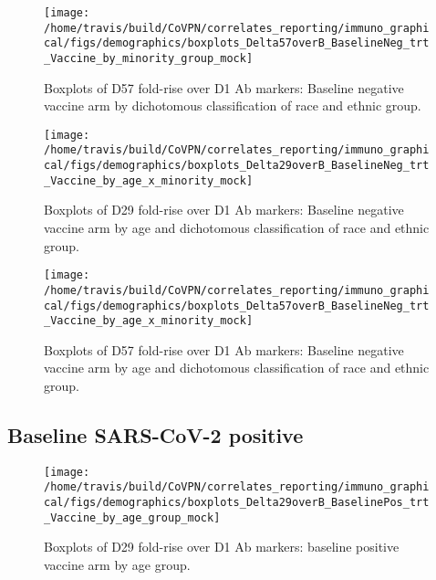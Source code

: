 \documentclass[]{book}
\theoremstyle{definition}
\theoremstyle{definition}
\theoremstyle{definition}
\newcommand{\1}{\mathbbm{1}}
\begin{document}
\begin{figure}[H]

{\centering \texttt{[image: /home/travis/build/CoVPN/correlates\_reporting/immuno\_graphical/figs/demographics/boxplots\_Delta57overB\_BaselineNeg\_trt\_Vaccine\_by\_minority\_group\_mock]} 

}

\caption{Boxplots of D57 fold-rise over D1 Ab markers: Baseline negative vaccine arm by dichotomous classification of race and ethnic group.}\label{fig:unnamed-chunk-159}
\end{figure}

\begin{figure}[H]

{\centering \texttt{[image: /home/travis/build/CoVPN/correlates\_reporting/immuno\_graphical/figs/demographics/boxplots\_Delta29overB\_BaselineNeg\_trt\_Vaccine\_by\_age\_x\_minority\_mock]} 

}

\caption{Boxplots of D29 fold-rise over D1 Ab markers: Baseline negative vaccine arm by age and dichotomous classification of race and ethnic group.}\label{fig:unnamed-chunk-162}
\end{figure}

\begin{figure}[H]

{\centering \texttt{[image: /home/travis/build/CoVPN/correlates\_reporting/immuno\_graphical/figs/demographics/boxplots\_Delta57overB\_BaselineNeg\_trt\_Vaccine\_by\_age\_x\_minority\_mock]} 

}

\caption{Boxplots of D57 fold-rise over D1 Ab markers: Baseline negative vaccine arm by age and dichotomous classification of race and ethnic group.}\label{fig:unnamed-chunk-163}
\end{figure}

\hypertarget{baseline-sars-cov-2-positive-5}{%
\subsection{Baseline SARS-CoV-2 positive}\label{baseline-sars-cov-2-positive-5}}

\begin{figure}[H]

{\centering \texttt{[image: /home/travis/build/CoVPN/correlates\_reporting/immuno\_graphical/figs/demographics/boxplots\_Delta29overB\_BaselinePos\_trt\_Vaccine\_by\_age\_group\_mock]} 

}

\caption{Boxplots of D29 fold-rise over D1 Ab markers: baseline positive vaccine arm by age group.}\label{fig:unnamed-chunk-166}
\end{figure}
\end{document}
